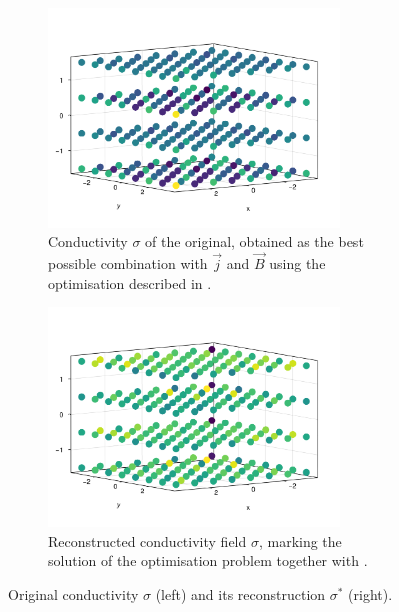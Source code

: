\documentclass[10pt]{article}
\begin{document}
  \begin{figure}[H]
    \centering
    \begin{subfigure}[t]{0.48\textwidth}
      \centering
      \includegraphics[width=0.85\textwidth]{../figures/cdpr-sigma.pdf}
      \caption{Conductivity $\sigma$ of the original, obtained as the best possible combination with $\vec{j}$ and $\vec{B}$ using the optimisation described in .}
      \label{fig:cdpr-sigma}
    \end{subfigure}
    \hfill
    \begin{subfigure}[t]{0.48\textwidth}
      \centering
      \includegraphics[width=0.85\textwidth]{../figures/cdprr-sigma.pdf}
      \caption{Reconstructed conductivity field $\sigma$, marking the solution of the optimisation problem together with .}
      \label{fig:cdprr-sigma}
    \end{subfigure}
    \caption{Original conductivity $\sigma$ (left) and its reconstruction $\sigma^*$ (right).}
  \end{figure}
\end{document}
